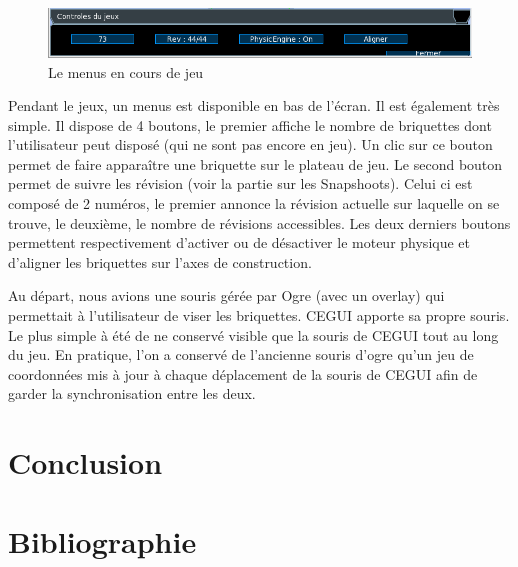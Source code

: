 \documentclass[frenchb,twoside]{EPURapport}
\begin{document}
		\begin{figure}[h]
			\centering
			\includegraphics[scale=0.75]{images/menu_jeu.png}
			\caption{\label{fig:menu_jeu}Le menus en cours de jeu}
		\end{figure}      
        Pendant le jeux, un menus est disponible en bas de l'écran. Il est
        également très simple. Il dispose de 4 boutons, le premier affiche le
        nombre de briquettes dont l'utilisateur peut disposé (qui ne sont pas
        encore en jeu). Un clic sur ce bouton permet de faire apparaître une
        briquette sur le plateau de jeu. Le second bouton permet de suivre les
        révision (voir la partie sur les Snapshoots). Celui ci est composé de 2
        numéros, le premier annonce la révision actuelle sur laquelle on se
        trouve, le deuxième, le nombre de révisions accessibles. Les deux
        derniers boutons permettent respectivement d'activer ou de désactiver le
        moteur physique et d'aligner les briquettes sur l'axes de construction.

        Au départ, nous avions une souris gérée par Ogre (avec un overlay) qui
        permettait à l'utilisateur de viser les briquettes. CEGUI apporte sa
        propre souris. Le plus simple à été de ne conservé visible que la
        souris de CEGUI tout au long du jeu. En pratique, l'on a conservé de
        l'ancienne souris d'ogre qu'un jeu de coordonnées mis à jour à chaque
        déplacement de la souris de CEGUI afin de garder la synchronisation
        entre les deux.
        
        
\chapter{Conclusion}




\chapter{Bibliographie}
\end{document}

